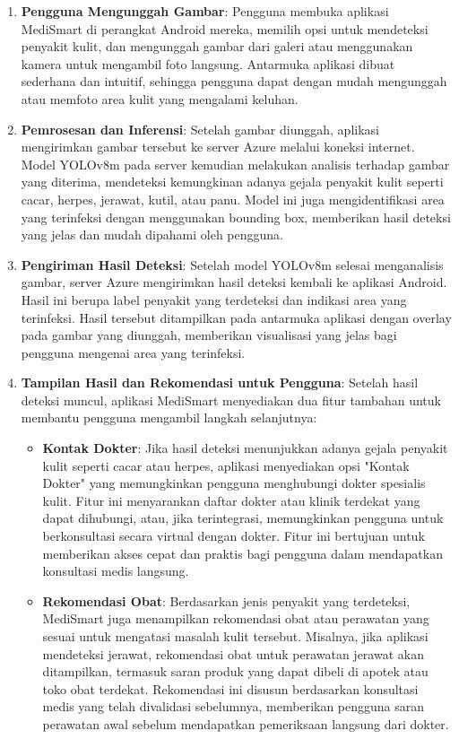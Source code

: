 \documentclass[journal,article,submit,pdftex,moreauthors]{Definitions/mdpi}
\begin{document}
\begin{enumerate}
    \item \textbf{Pengguna Mengunggah Gambar}: Pengguna membuka aplikasi MediSmart di perangkat Android mereka, memilih opsi untuk mendeteksi penyakit kulit, dan mengunggah gambar dari galeri atau menggunakan kamera untuk mengambil foto langsung. Antarmuka aplikasi dibuat sederhana dan intuitif, sehingga pengguna dapat dengan mudah mengunggah atau memfoto area kulit yang mengalami keluhan.
    
    \item \textbf{Pemrosesan dan Inferensi}: Setelah gambar diunggah, aplikasi mengirimkan gambar tersebut ke server Azure melalui koneksi internet. Model YOLOv8m pada server kemudian melakukan analisis terhadap gambar yang diterima, mendeteksi kemungkinan adanya gejala penyakit kulit seperti cacar, herpes, jerawat, kutil, atau panu. Model ini juga mengidentifikasi area yang terinfeksi dengan menggunakan bounding box, memberikan hasil deteksi yang jelas dan mudah dipahami oleh pengguna.
    
    \item \textbf{Pengiriman Hasil Deteksi}: Setelah model YOLOv8m selesai menganalisis gambar, server Azure mengirimkan hasil deteksi kembali ke aplikasi Android. Hasil ini berupa label penyakit yang terdeteksi dan indikasi area yang terinfeksi. Hasil tersebut ditampilkan pada antarmuka aplikasi dengan overlay pada gambar yang diunggah, memberikan visualisasi yang jelas bagi pengguna mengenai area yang terinfeksi.
    
    \item \textbf{Tampilan Hasil dan Rekomendasi untuk Pengguna}: Setelah hasil deteksi muncul, aplikasi MediSmart menyediakan dua fitur tambahan untuk membantu pengguna mengambil langkah selanjutnya:
    \begin{itemize}
        \item \textbf{Kontak Dokter}: Jika hasil deteksi menunjukkan adanya gejala penyakit kulit seperti cacar atau herpes, aplikasi menyediakan opsi "Kontak Dokter" yang memungkinkan pengguna menghubungi dokter spesialis kulit. Fitur ini menyarankan daftar dokter atau klinik terdekat yang dapat dihubungi, atau, jika terintegrasi, memungkinkan pengguna untuk berkonsultasi secara virtual dengan dokter. Fitur ini bertujuan untuk memberikan akses cepat dan praktis bagi pengguna dalam mendapatkan konsultasi medis langsung.
        \item \textbf{Rekomendasi Obat}: Berdasarkan jenis penyakit yang terdeteksi, MediSmart juga menampilkan rekomendasi obat atau perawatan yang sesuai untuk mengatasi masalah kulit tersebut. Misalnya, jika aplikasi mendeteksi jerawat, rekomendasi obat untuk perawatan jerawat akan ditampilkan, termasuk saran produk yang dapat dibeli di apotek atau toko obat terdekat. Rekomendasi ini disusun berdasarkan konsultasi medis yang telah divalidasi sebelumnya, memberikan pengguna saran perawatan awal sebelum mendapatkan pemeriksaan langsung dari dokter.
    \end{itemize}
\end{enumerate}
\end{document}
